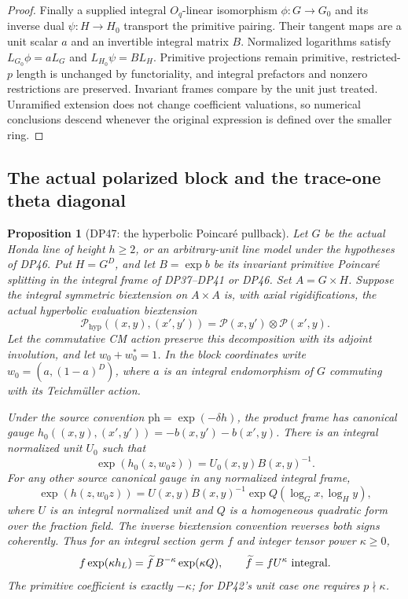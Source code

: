 \documentclass[11pt,a4paper]{article}
\newtheorem{proposition}[theorem]{Proposition}
\theoremstyle{definition}\newtheorem{remark}[theorem]{Remark}
\begin{document}
\begin{proof}
Finally a supplied integral $O_q$-linear isomorphism $\phi:G\to G_0$ and its inverse dual $\psi:H\to H_0$ transport the primitive pairing. Their tangent maps are a unit scalar $a$ and an invertible integral matrix $B$. Normalized logarithms satisfy
$L_{G_0}\phi=aL_G$ and $L_{H_0}\psi=BL_H$.
Primitive projections remain primitive, restricted-$p$ length is unchanged by functoriality, and integral prefactors and nonzero restrictions are preserved. Invariant frames compare by the unit just treated. Unramified extension does not change coefficient valuations, so numerical conclusions descend whenever the original expression is defined over the smaller ring.
\end{proof}


\subsection{The actual polarized block and the trace-one theta diagonal}

\begin{proposition}[DP47: the hyperbolic Poincar\'e pullback]\label{DP47}
Let $G$ be the actual Honda line of height $h\ge2$, or an arbitrary-unit line model under the hypotheses of DP46. Put $H=G^D$, and let
$B=\exp b$ be its invariant primitive Poincar\'e splitting in the integral frame of DP37--DP41 or DP46. Set $A=G\times H$. Suppose the integral symmetric biextension on $A\times A$ is, with axial rigidifications, the actual hyperbolic evaluation biextension
\[
 \mathcal P_{\mathrm{hyp}}((x,y),(x',y'))
       =\mathcal P(x,y')\otimes\mathcal P(x',y).
\]
Let the commutative CM action preserve this decomposition with its adjoint involution, and let $w_0+w_0^*=1$. In the block coordinates write
$w_0=(a,(1-a)^D)$, where $a$ is an integral endomorphism of $G$ commuting with its Teichm\"uller action.

Under the source convention $\mathrm{ph}=\exp(-\delta h)$, the product frame has canonical gauge
$h_0((x,y),(x',y'))=-b(x,y')-b(x',y)$.
There is an integral normalized unit $U_0$ such that
\[
 \exp(h_0(z,w_0z))=U_0(x,y)B(x,y)^{-1}.
\]
For any other source canonical gauge in any normalized integral frame,
\begin{equation}\label{eq:hyperbolicpullback}
 \exp(h(z,w_0z))=U(x,y)B(x,y)^{-1}
                       \exp Q(\log_Gx,\log_Hy),
\end{equation}
where $U$ is an integral normalized unit and $Q$ is a homogeneous quadratic form over the fraction field.
The inverse biextension convention reverses both signs coherently.
Thus for an integral section germ $f$ and integer tensor power $\kappa\ge0$,
\[
 f\exp(\kappa h_L)=\widetilde f\,B^{-\kappa}\exp(\kappa Q),
 \qquad \widetilde f=fU^\kappa\ \hbox{integral}.
\]
The primitive coefficient is exactly $-\kappa$; for DP42's unit case one requires $p\nmid\kappa$.
\end{proposition}
\end{document}
